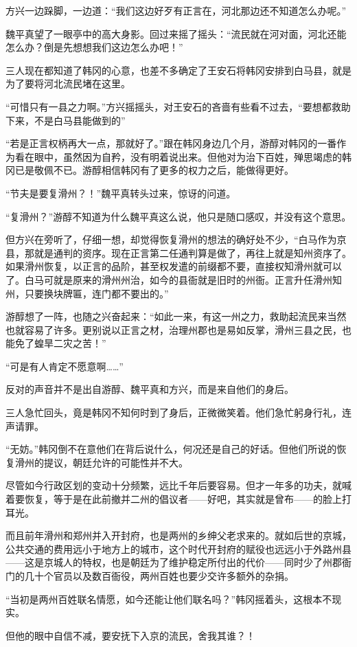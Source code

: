 方兴一边跺脚，一边道：“我们这边好歹有正言在，河北那边还不知道怎么办呢。”

魏平真望了一眼亭中的高大身影。回过来摇了摇头：“流民就在河对面，河北还能怎么办？倒是先想想我们这边怎么办吧！”

三人现在都知道了韩冈的心意，也差不多确定了王安石将韩冈安排到白马县，就是为了要将河北流民堵在这里。

“可惜只有一县之力啊。”方兴摇摇头，对王安石的吝啬有些看不过去，“要想都救助下来，不是白马县能做到的”

“若是正言权柄再大一点，那就好了。”跟在韩冈身边几个月，游醇对韩冈的一番作为看在眼中，虽然因为自矜，没有明着说出来。但他对为治下百姓，殚思竭虑的韩冈已是敬佩不已。游醇相信韩冈有了更多的权力之后，能做得更好。

“节夫是要复滑州？！”魏平真转头过来，惊讶的问道。

“复滑州？”游醇不知道为什么魏平真这么说，他只是随口感叹，并没有这个意思。

但方兴在旁听了，仔细一想，却觉得恢复滑州的想法的确好处不少，“白马作为京县，那就是通判的资序。现在正言第二任通判算是做了，再往上就是知州资序了。如果滑州恢复，以正言的品阶，甚至权发遣的前缀都不要，直接权知滑州就可以了。白马可就是原来的滑州州治，如今的县衙就是旧时的州衙。正言升任滑州知州，只要换块牌匾，连门都不要出的。”

游醇想了一阵，也随之兴奋起来：“如此一来，有这一州之力，救助起流民来当然也就容易了许多。更别说以正言之材，治理州郡也是易如反掌，滑州三县之民，也能免了蝗旱二灾之苦！”

“可是有人肯定不愿意啊……”

反对的声音并不是出自游醇、魏平真和方兴，而是来自他们的身后。

三人急忙回头，竟是韩冈不知何时到了身后，正微微笑着。他们急忙躬身行礼，连声请罪。

“无妨。”韩冈倒不在意他们在背后说什么，何况还是自己的好话。但他们所说的恢复滑州的提议，朝廷允许的可能性并不大。

尽管如今行政区划的变动十分频繁，远比千年后要容易。但才一年多的功夫，就喊着要恢复，等于是在此前撤并二州的倡议者——好吧，其实就是曾布——的脸上打耳光。

而且前年滑州和郑州并入开封府，也是两州的乡绅父老求来的。就如后世的京城，公共交通的费用远小于地方上的城市，这个时代开封府的赋役也远远小于外路州县——这是京城人的特权，也是朝廷为了维护稳定所付出的代价——同时少了州郡衙门的几十个官员以及数百衙役，两州百姓也要少交许多额外的杂捐。

“当初是两州百姓联名情愿，如今还能让他们联名吗？”韩冈摇着头，这根本不现实。

但他的眼中自信不减，要安抚下入京的流民，舍我其谁？！

